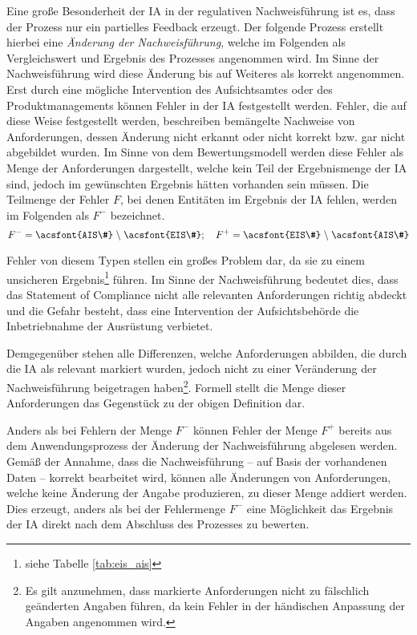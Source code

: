 Eine große Besonderheit der \ac{IA} in der regulativen Nachweisführung ist es, dass der Prozess nur ein partielles Feedback erzeugt.
Der folgende Prozess erstellt hierbei eine \textit{Änderung der Nachweisführung}, welche im Folgenden als Vergleichswert und Ergebnis des Prozesses angenommen wird.
Im Sinne der Nachweisführung wird diese Änderung bis auf Weiteres als korrekt angenommen.
Erst durch eine mögliche Intervention des Aufsichtsamtes oder des Produktmanagements können Fehler in der \ac{IA} festgestellt werden.
Fehler, die auf diese Weise festgestellt werden, beschreiben bemängelte Nachweise von Anforderungen, dessen Änderung nicht erkannt oder nicht korrekt bzw. gar nicht abgebildet wurden.
Im Sinne von dem Bewertungsmodell werden diese Fehler als Menge der Anforderungen dargestellt, welche kein Teil der Ergebnismenge der \ac{IA} sind, jedoch im gewünschten Ergebnis hätten vorhanden sein müssen.
Die Teilmenge der Fehler $F$, bei denen Entitäten im Ergebnis der \ac{IA} fehlen, werden im Folgenden als $F^-$ bezeichnet.
$$
    F^- = \text{\acsfont{AIS\#}} \;\backslash\; \text{\acsfont{EIS\#}}; \quad 
    F^+ = \text{\acsfont{EIS\#}} \;\backslash\; \text{\acsfont{AIS\#}}
$$

\noindent
Fehler von diesem Typen stellen ein großes Problem dar, da sie zu einem unsicheren Ergebnis\footnote{siehe Tabelle \ref{tab:eis_ais}} führen.
Im Sinne der Nachweisführung bedeutet dies, dass das Statement of Compliance nicht alle relevanten Anforderungen richtig abdeckt und die Gefahr besteht, dass eine Intervention der Aufsichtsbehörde die Inbetriebnahme der Ausrüstung verbietet.

\medskip
Demgegenüber stehen alle Differenzen, welche Anforderungen abbilden, die durch die \ac{IA} als relevant markiert wurden, jedoch nicht zu einer Veränderung der Nachweisführung beigetragen haben\footnote{Es gilt anzunehmen, dass markierte Anforderungen nicht zu fälschlich geänderten Angaben führen, da kein Fehler in der händischen Anpassung der Angaben angenommen wird.}.
Formell stellt die Menge dieser Anforderungen das Gegenstück zu der obigen Definition dar.

\medskip
Anders als bei Fehlern der Menge $F^-$ können Fehler der Menge $F^+$ bereits aus dem Anwendungsprozess der Änderung der Nachweisführung abgelesen werden.
Gemäß der Annahme, dass die Nachweisführung -- auf Basis der vorhandenen Daten -- korrekt bearbeitet wird, können alle Änderungen von Anforderungen, welche keine Änderung der Angabe produzieren, zu dieser Menge addiert werden.
Dies erzeugt, anders als bei der Fehlermenge $F^-$ eine Möglichkeit das Ergebnis der \ac{IA} direkt nach dem Abschluss des Prozesses zu bewerten.

